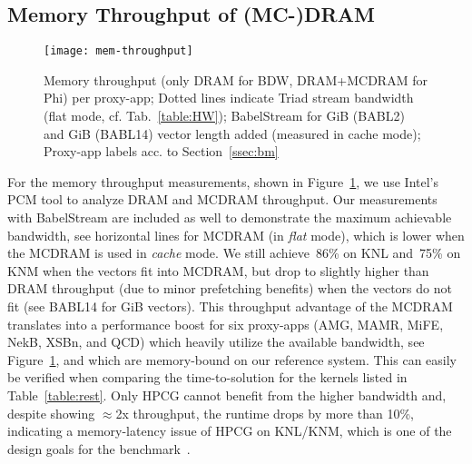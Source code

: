 \subsection{Memory Throughput of (MC-)DRAM}\label{ssec:eval_mem}
%
\begin{figure}[tbp]
    \centering
    \texttt{[image: mem-throughput]}
    \caption{\label{fig:memthru} Memory throughput (only DRAM for BDW, DRAM+MCDRAM for Phi) per proxy-app; Dotted lines indicate Triad stream bandwidth (flat mode, cf. Tab.~\ref{table:HW}); BabelStream for \unit[2]{GiB} (BABL2) and \unit[14]{GiB} (BABL14) vector length added (measured in cache mode); Proxy-app labels acc. to Section~\ref{ssec:bm}}
    \vspace{-0.6em}
\end{figure}
%
For the memory throughput measurements, shown in Figure~\ref{fig:memthru}, we use Intel's PCM tool to analyze DRAM and MCDRAM throughput.
Our measurements with BabelStream are included as well to demonstrate the maximum achievable bandwidth, see horizontal lines for MCDRAM
(in \textit{flat} mode), which is lower when the MCDRAM is used in \textit{cache} mode.
We still achieve~86\% on KNL and~75\% on KNM when the vectors fit into MCDRAM, but drop to slightly
higher than DRAM throughput (due to minor prefetching benefits) when the vectors do not fit (see BABL14 for \unit[14]{GiB} vectors).
This throughput advantage of the MCDRAM translates into a performance boost for six proxy-apps (AMG, MAMR, MiFE, NekB, XSBn, and QCD)
which heavily utilize the available bandwidth, see Figure~\ref{fig:memthru}, and which are memory-bound on our reference system.
This can easily be verified when comparing the time-to-solution for the kernels listed in Table~\ref{table:rest}.
Only HPCG cannot benefit from the higher bandwidth and, despite showing $\approx$2x throughput, the runtime drops by more than 10\%,
indicating a memory-latency issue of HPCG on KNL/KNM, which is one of the design goals for the benchmark~\cite{dongarra_new_2016}.
%

